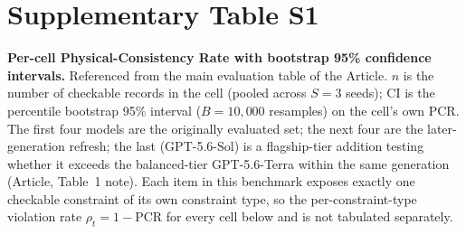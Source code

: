 \documentclass[11pt,a4paper]{article}
\begin{document}
\clearpage
\section*{Supplementary Table S1}
\noindent\textbf{Per-cell Physical-Consistency Rate with bootstrap 95\% confidence
intervals.} Referenced from the main evaluation table of the Article. $n$ is the number of checkable records in the cell
(pooled across $S=3$ seeds); CI is the percentile bootstrap 95\% interval ($B=10{,}000$
resamples) on the cell's own PCR. The first four models are the originally evaluated set;
the next four are the later-generation refresh; the last (GPT-5.6-Sol) is a flagship-tier
addition testing whether it exceeds the balanced-tier GPT-5.6-Terra within the same
generation (Article, Table~1 note). Each item in this benchmark exposes
exactly one checkable constraint of its own constraint type, so the per-constraint-type
violation rate $\rho_t=1-\mathrm{PCR}$ for every cell below and is not tabulated separately.
\end{document}
